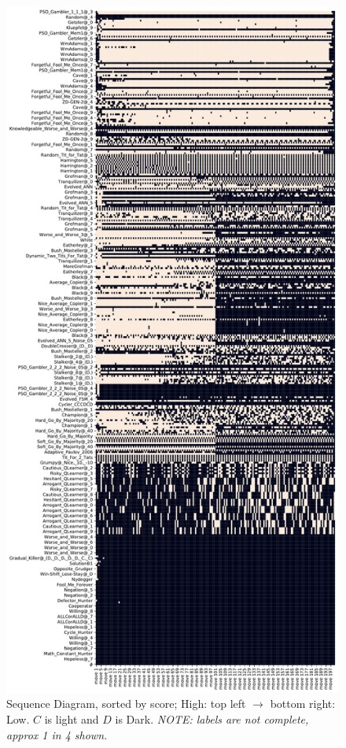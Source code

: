 \begin{figure}[ht]
\begin{minipage}{0.48\textwidth}
    \end{minipage}\hfill
    \begin{minipage}{0.48\textwidth}
        \includegraphics[width=1.0\textwidth, center]{./img/descriptive/sequence_plot_score_pt2.pdf}
    \end{minipage}
    \caption{Sequence Diagram, sorted by score; High: top left $\rightarrow$ bottom right: Low. $C$ is light and $D$ is Dark.
    \textit{NOTE: labels are not complete, approx 1 in 4 shown.}}\label{fig:sequence_plot_score}
\end{figure}

